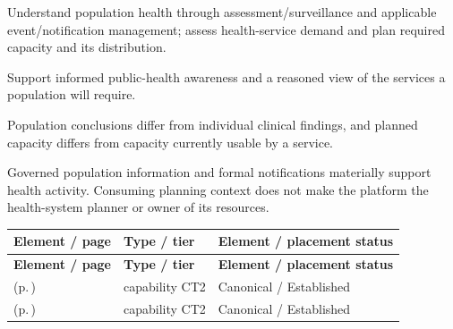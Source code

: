 
Understand population health through assessment/\allowbreak{}surveillance and applicable event/\allowbreak{}notification management; assess health-service demand and plan required capacity and its distribution.



Support informed public-health awareness and a reasoned view of the services a population will require.



Population conclusions differ from individual clinical findings, and planned capacity differs from capacity currently usable by a service.



Governed population information and formal notifications materially support health activity. Consuming planning context does not make the platform the health-system planner or owner of its resources.


\begingroup\small\setlength{\TableWidth}{\dimexpr\linewidth-6\tabcolsep-4\arrayrulewidth\relax}
\begin{longtable}{|>{\raggedright\arraybackslash}p{0.52\TableWidth}|>{\raggedright\arraybackslash}p{0.2\TableWidth}|>{\raggedright\arraybackslash}p{0.28\TableWidth}|}
\hline\rowcolor{TableHead}\textbf{Element / page} & \textbf{Type / tier} & \textbf{Element / placement status}\\\hline\endfirsthead
\hline\rowcolor{TableHead}\textbf{Element / page} & \textbf{Type / tier} & \textbf{Element / placement status}\\\hline\endhead
\hline\endfoot
\nameref{cap:bc-population-health-surveillance} (p.\,\pageref{cap:bc-population-health-surveillance}) & capability CT2 & Canonical / Established\\\hline
\nameref{cap:bc-health-system-planning} (p.\,\pageref{cap:bc-health-system-planning}) & capability CT2 & Canonical / Established\\\hline
\end{longtable}\endgroup


